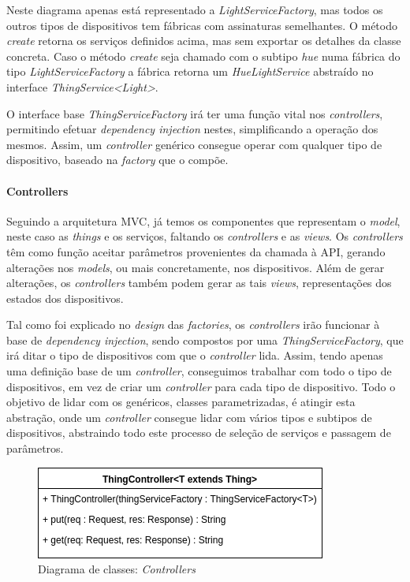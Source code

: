 Neste diagrama apenas está representado a \textit{LightServiceFactory}, mas todos os outros tipos de dispositivos tem fábricas com assinaturas semelhantes. O método \textit{create} retorna os serviços definidos acima, mas sem exportar os detalhes da classe concreta. Caso o método \textit{create} seja chamado com o subtipo \textit{hue} numa fábrica do tipo \textit{LightServiceFactory} a fábrica retorna um \textit{HueLightService} abstraído no interface \textit{ThingService<Light>}.

O interface base \textit{ThingServiceFactory} irá ter uma função vital nos \textit{controllers}, permitindo efetuar \textit{dependency injection} nestes, simplificando a operação dos mesmos. Assim, um \textit{controller} genérico consegue operar com qualquer tipo de dispositivo, baseado na \textit{factory} que o compõe.

%
%
%
%

\paragraph*{Controllers}

Seguindo a arquitetura MVC, já temos os componentes que representam o \textit{model}, neste caso as \textit{things} e os serviços, faltando os \textit{controllers} e as \textit{views}. Os \textit{controllers} têm como função aceitar parâmetros provenientes da chamada à API, gerando alterações nos \textit{models}, ou mais concretamente, nos dispositivos. Além de gerar alterações, os \textit{controllers} também podem gerar as tais \textit{views}, representações dos estados dos dispositivos.

Tal como foi explicado no \textit{design} das \textit{factories}, os \textit{controllers} irão funcionar à base de \textit{dependency injection}, sendo compostos por uma \textit{ThingServiceFactory}, que irá ditar o tipo de dispositivos com que o \textit{controller} lida. Assim, tendo apenas uma definição base de um \textit{controller}, conseguimos trabalhar com todo o tipo de dispositivos, em vez de criar um \textit{controller} para cada tipo de dispositivo. Todo o objetivo de lidar com os genéricos, classes parametrizadas, é atingir esta abstração, onde um \textit{controller} consegue lidar com vários tipos e subtipos de dispositivos, abstraindo todo este processo de seleção de serviços e passagem de parâmetros.

\begin{figure}[H]
  \centering
        \includegraphics[scale=0.75]{img/hub-controllers.png}
  \caption{Diagrama de classes: \textit{Controllers}}
\end{figure}

